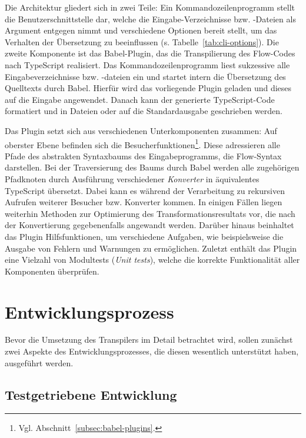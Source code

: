Die Architektur gliedert sich in zwei Teile: Ein Kommandozeilenprogramm stellt die Benutzerschnittstelle dar, welche die Eingabe-Verzeichnisse bzw. -Dateien als Argument entgegen nimmt und verschiedene Optionen bereit stellt, um das Verhalten der Übersetzung zu beeinflussen (s. Tabelle~\ref{tab:cli-options}). Die zweite Komponente ist das Babel-Plugin, das die Transpilierung des Flow-Codes nach TypeScript realisiert. Das Kommandozeilenprogramm liest sukzessive alle Eingabeverzeichnisse bzw. -dateien ein und startet intern die Übersetzung des Quelltexts durch Babel. Hierfür wird das vorliegende Plugin geladen und dieses auf die Eingabe angewendet. Danach kann der generierte TypeScript-Code formatiert und in Dateien oder auf die Standardausgabe geschrieben werden.

Das Plugin setzt sich aus verschiedenen Unterkomponenten zusammen: Auf oberster Ebene befinden sich die Besucherfunktionen\footnote{Vgl. Abschnitt~\ref{subsec:babel-plugins}.}. Diese adressieren alle Pfade des abstrakten Syntaxbaums des Eingabeprogramms, die Flow-Syntax darstellen. Bei der Traversierung des Baums durch Babel werden alle zugehörigen Pfadknoten durch Ausführung verschiedener \emph{Konverter} in äquivalentes TypeScript übersetzt. Dabei kann es während der Verarbeitung zu rekursiven Aufrufen weiterer Besucher bzw. Konverter kommen. In einigen Fällen liegen weiterhin Methoden zur Optimierung des Transformationsresultats vor, die nach der Konvertierung gegebenenfalls angewandt werden. Darüber hinaus beinhaltet das Plugin Hilfsfunktionen, um verschiedene Aufgaben, wie beispielsweise die Ausgabe von Fehlern und Warnungen zu ermöglichen. Zuletzt enthält das Plugin eine Vielzahl von Modultests (\textit{Unit tests}), welche die korrekte Funktionalität aller Komponenten überprüfen.

\section{Entwicklungsprozess}

Bevor die Umsetzung des Transpilers im Detail betrachtet wird, sollen zunächst zwei Aspekte des Entwicklungsprozesses, die diesen wesentlich unterstützt haben, ausgeführt werden.

\subsection{Testgetriebene Entwicklung}

